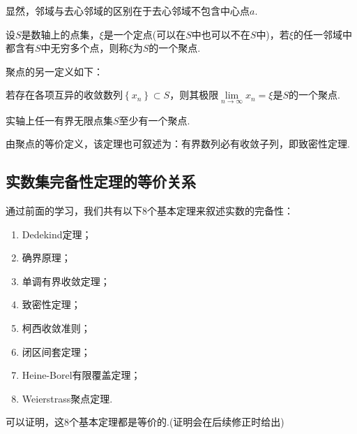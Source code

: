 显然，邻域与去心邻域的区别在于去心邻域不包含中心点$a$.
\begin{definition}[聚点]
	设$S$是数轴上的点集，$\xi$是一个定点(可以在$S$中也可以不在$S$中)，若$\xi$的任一邻域中都含有$S$中无穷多个点，则称$\xi$为$S$的一个聚点.
\end{definition}
聚点的另一定义如下：
\begin{definition}
	若存在各项互异的收敛数列$\left\{x_n\right\}\subset S$，则其极限$\lim\limits_{n\to \infty}x_n=\xi$是$S$的一个聚点.
\end{definition}
\begin{theorem}[Weierstrass聚点定理]
	实轴上任一有界无限点集$S$至少有一个聚点.
\end{theorem}
由聚点的等价定义，该定理也可叙述为：{\heiti 有界数列必有收敛子列}，即致密性定理.
\subsection{实数集完备性定理的等价关系}
通过前面的学习，我们共有以下8个基本定理来叙述实数的完备性：
\begin{enumerate}
	\item Dedekind定理；
	\item 确界原理；
	\item 单调有界收敛定理；
	\item 致密性定理；
	\item 柯西收敛准则；
	\item 闭区间套定理；
	\item Heine-Borel有限覆盖定理；
	\item Weierstrass聚点定理.
\end{enumerate}
可以证明，这8个基本定理都是等价的.(证明会在后续修正时给出)